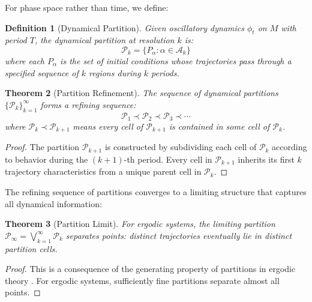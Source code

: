 \documentclass[twocolumn,10pt,a4paper]{article}
\newtheorem{theorem}{Theorem}[section]
\newtheorem{definition}[theorem]{Definition}
\begin{document}
For phase space rather than time, we define:

\begin{definition}[Dynamical Partition]
\label{def:dyn_partition}
Given oscillatory dynamics $\phi_t$ on $M$ with period $T$, the \emph{dynamical partition} at resolution $k$ is:
\begin{equation}
\mathcal{P}_k = \{P_\alpha : \alpha \in \mathcal{A}_k\}
\end{equation}
where each $P_\alpha$ is the set of initial conditions whose trajectories pass through a specified sequence of $k$ regions during $k$ periods.
\end{definition}

\begin{theorem}[Partition Refinement]
\label{thm:refinement}
The sequence of dynamical partitions $\{\mathcal{P}_k\}_{k=1}^\infty$ forms a refining sequence:
\begin{equation}
\mathcal{P}_1 \prec \mathcal{P}_2 \prec \mathcal{P}_3 \prec \cdots
\end{equation}
where $\mathcal{P}_k \prec \mathcal{P}_{k+1}$ means every cell of $\mathcal{P}_{k+1}$ is contained in some cell of $\mathcal{P}_k$.
\end{theorem}

\begin{proof}
The partition $\mathcal{P}_{k+1}$ is constructed by subdividing each cell of $\mathcal{P}_k$ according to behavior during the $(k+1)$-th period. Every cell in $\mathcal{P}_{k+1}$ inherits its first $k$ trajectory characteristics from a unique parent cell in $\mathcal{P}_k$.
\end{proof}

The refining sequence of partitions converges to a limiting structure that captures all dynamical information:

\begin{theorem}[Partition Limit]
\label{thm:partition_limit}
For ergodic systems, the limiting partition $\mathcal{P}_\infty = \bigvee_{k=1}^\infty \mathcal{P}_k$ separates points: distinct trajectories eventually lie in distinct partition cells.
\end{theorem}

\begin{proof}
This is a consequence of the generating property of partitions in ergodic theory \citep{sinai1959concept, kolmogorov1958new}. For ergodic systems, sufficiently fine partitions separate almost all points.
\end{proof}
\end{document}
